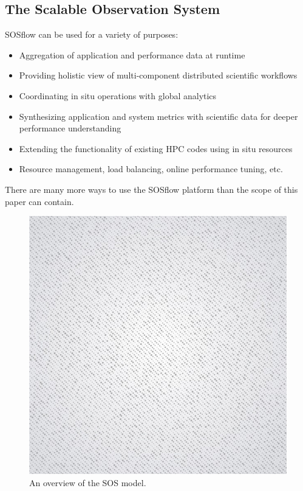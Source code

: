 \subsection{The Scalable Observation System} %
%
SOSflow can be used for a variety of
purposes:
\begin{itemize}
    \item Aggregation of application and performance
        data at runtime
    \item Providing holistic view of multi-component
        distributed scientific workflows
    \item Coordinating in situ operations with global
        analytics
    \item Synthesizing application and system metrics
        with scientific data for deeper performance
        understanding
    \item Extending the functionality of existing HPC
        codes using in situ resources
    \item Resource management, load balancing, online
        performance tuning, etc.
\end{itemize}
%
There are many more ways to use the SOSflow platform than the scope of this
paper can contain.
%
\begin{figure}[h]
\centering
\includegraphics[width=\columnwidth]{images/placeholder.jpg}
\caption{An overview of the SOS model.}
\label{fig_sos_overview}
\end{figure}
